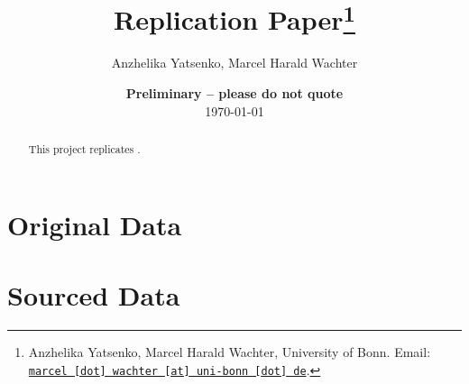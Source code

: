 \documentclass[11pt, a4paper, leqno]{article}
\begin{document}
\title{Replication Paper\thanks{Anzhelika Yatsenko, Marcel Harald Wachter, University of Bonn. Email: \href{mailto:marcel.wachter@uni-bonn.de}{\nolinkurl{marcel [dot] wachter [at] uni-bonn [dot] de}}.}}

\author{Anzhelika Yatsenko, Marcel Harald Wachter}

\date{
    {\bf Preliminary -- please do not quote}
    \\[1ex]
    \today
}

\maketitle


\begin{abstract}
    This project replicates \citep{Rose2004}.
\end{abstract}

\clearpage
\section{Original Data}









\clearpage
\section{Sourced Data}





%


 \clearpage

\printbibliography
{}


\end{document}
